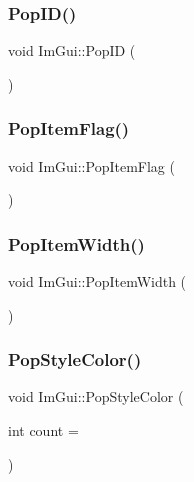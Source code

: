 \hypertarget{namespace_im_gui_aba0b2d8f890a5d435ae43d0c4a2d4dd1}{}\label{namespace_im_gui_aba0b2d8f890a5d435ae43d0c4a2d4dd1} 
\subsubsection{\texorpdfstring{Pop\+I\+D()}{PopID()}}
{\footnotesize\ttfamily void Im\+Gui\+::\+Pop\+ID (\begin{DoxyParamCaption}{ }\end{DoxyParamCaption})}

\hypertarget{namespace_im_gui_aa93281155e1dd23715dbd384e91edc6b}{}\label{namespace_im_gui_aa93281155e1dd23715dbd384e91edc6b} 
\subsubsection{\texorpdfstring{Pop\+Item\+Flag()}{PopItemFlag()}}
{\footnotesize\ttfamily void Im\+Gui\+::\+Pop\+Item\+Flag (\begin{DoxyParamCaption}{ }\end{DoxyParamCaption})}

\hypertarget{namespace_im_gui_ad29a3fc0cb5dfc7f9fc7224512ce90bf}{}\label{namespace_im_gui_ad29a3fc0cb5dfc7f9fc7224512ce90bf} 
\subsubsection{\texorpdfstring{Pop\+Item\+Width()}{PopItemWidth()}}
{\footnotesize\ttfamily void Im\+Gui\+::\+Pop\+Item\+Width (\begin{DoxyParamCaption}{ }\end{DoxyParamCaption})}

\hypertarget{namespace_im_gui_a9795f730b4043a98b6254738d86efcdc}{}\label{namespace_im_gui_a9795f730b4043a98b6254738d86efcdc} 
\subsubsection{\texorpdfstring{Pop\+Style\+Color()}{PopStyleColor()}}
{\footnotesize\ttfamily void Im\+Gui\+::\+Pop\+Style\+Color (\begin{DoxyParamCaption}\item[{int}]{count = {} }\end{DoxyParamCaption})}

